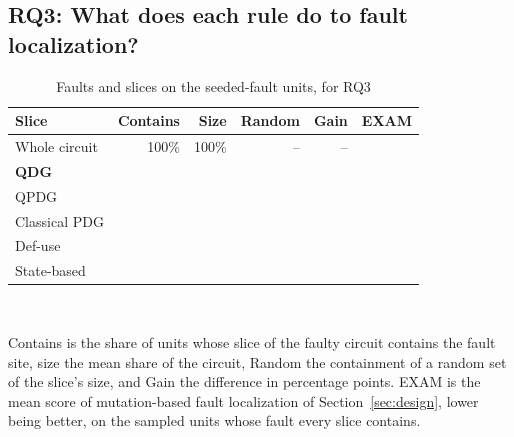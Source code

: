 \subsection{RQ3: What does each rule do to fault localization?}

\begin{table}[t]
  \centering
  \caption{Faults and slices on the \numRqThreeUnits{} seeded-fault units, for RQ3}
  \label{tab:rq3}
  \footnotesize\setlength{\tabcolsep}{3pt}\renewcommand{\arraystretch}{1.12}
  \newcommand{\sep}{\arrayrulecolor{black!25}\hline\arrayrulecolor{black}}
  \begin{tabular}{@{}l r r r r r@{}}
    \toprule
    \textbf{Slice} & \textbf{Contains} & \textbf{Size} & \textbf{Random} & \textbf{Gain} & \textbf{EXAM} \\
    \midrule
    Whole circuit & 100\% & 100\% & -- & -- & \numMbflAllExamAll{} \\
    \midrule
    \rowcolor{blue!7}\textbf{QDG} & \numRqThreeContainLc{} & \numRqThreeSizeLc{} & \numSizeCtlLcRandom{} & \numSizeCtlLcGain{} & \numMbflAllExamLc{} \\ \sep
    QPDG & \numRqThreeContainYz{} & \numRqThreeSizeYz{} & \numSizeCtlYzRandom{} & \numSizeCtlYzGain{} & \numMbflAllExamYz{} \\ \sep
    Classical PDG & \numRqThreeContainCpdg{} & \numRqThreeSizeCpdg{} & \numSizeCtlCpdgRandom{} & \numSizeCtlCpdgGain{} & \numMbflAllExamCpdg{} \\ \sep
    Def-use & \numRqThreeContainDu{} & \numRqThreeSizeDu{} & \numSizeCtlDuRandom{} & \numSizeCtlDuGain{} & \numMbflAllExamDu{} \\ \sep
    State-based & \numRqThreeContainQ{} & \numRqThreeSizeQ{} & \numSizeCtlQRandom{} & \numSizeCtlQGain{} & \numMbflAllExamQ{} \\
    \bottomrule
  \end{tabular}\\[3pt]
  \begin{minipage}{\columnwidth}\footnotesize
  Contains is the share of units whose slice of the faulty circuit contains the fault site, size the mean share of the
  circuit, Random the containment of a random set of the slice's size, and Gain the difference in percentage points.
  EXAM is the mean score of mutation-based fault localization of Section~\ref{sec:design}, lower being better, on
  the \numMbflAllN{} sampled units whose fault every slice contains.
  \end{minipage}
\end{table}


